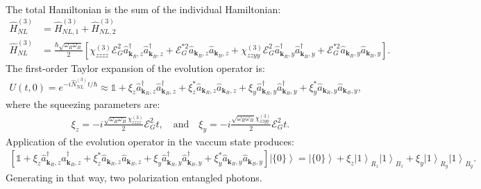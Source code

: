 \documentclass[letterpaper,11pt,twoside]{article}
\newcommand{\E}{\mathcal{E}}
\newcommand{\bk}{\bm{k}}
\newcommand{\ha}{\hat{a}}
\newcommand{\hH}{\hat{H}}
\newcommand{\hN}{\hat{N}}
\newcommand{\ket}[1]{\left|#1\right\rangle}
\begin{document}
\begin{enumerate}[itemsep=0pt,topsep=0pt,parsep=0pt,label=\alph*)]
\begin{align*}
  \end{align*}
  The total Hamiltonian is the sum of the individual Hamiltonian:
  \begin{align*}
    \hH_{NL}^{(3)}&=\hH_{NL,1}^{(3)}+\hH_{NL,2}^{(3)}\\
    \hH_{NL}^{(3)}&=\frac{\hbar\sqrt{\omega_R\omega_B}}{2}\left[\chi_{zzzz}^{(3)}\E_G^2\ha^\dagger_{\bk_R,z}\ha^\dagger_{\bk_B,z}+\E^{*2}_G\ha_{\bk_R,z}\ha_{\bk_B,z}+
    \chi_{zzyy}^{(3)}\E_G^2\ha^\dagger_{\bk_R,y}\ha^\dagger_{\bk_B,y}+\E^{*2}_G\ha_{\bk_R,y}\ha_{\bk_B,y}\right].
  \end{align*}
  The first-order Taylor expansion of the evolution operator is:
  \begin{align*}
    U(t,0)=e^{-i\hN_{NL}^{(3)}t/\hbar}\approx\mathds{1}+\xi_z\ha^\dagger_{\bk_R,z}\ha^\dagger_{\bk_B,z}+\xi^*_z\ha_{\bk_R,z}\ha_{\bk_B,z}+\xi_y\ha^\dagger_{\bk_R,y}\ha^\dagger_{\bk_B,y}+\xi^*_y\ha_{\bk_R,y}\ha_{\bk_B,y},
  \end{align*}
  where the squeezing parameters are:
  \begin{align*}
    \xi_z=-i\frac{\sqrt{\omega_R\omega_B}\chi_{zzzz}^{(3)}}{2}\E_G^2t,\quad\text{and}\quad\xi_y=-i\frac{\sqrt{\omega_R\omega_B}\chi_{zzyy}^{(3)}}{2}\E_G^2t.
  \end{align*}
  Application of the evolution operator in the vaccum state produces:
  {\small
  \begin{align*}
    \left[\mathds{1}+\xi_z\ha^\dagger_{\bk_R,z}\ha^\dagger_{\bk_B,z}+\xi^*_z\ha_{\bk_R,z}\ha_{\bk_B,z}+\xi_y\ha^\dagger_{\bk_R,y}\ha^\dagger_{\bk_B,y}+\xi^*_y\ha_{\bk_R,y}\ha_{\bk_B,y}\right]\ket{\{0\}}=\ket{\{0\}}+\xi_z\ket{1}_{R_z}\ket{1}_{B_z}+\xi_y\ket{1}_{R_y}\ket{1}_{B_y}.
  \end{align*}}
  Generating in that way, two polarization entangled photons.
\end{enumerate}
\end{document}
